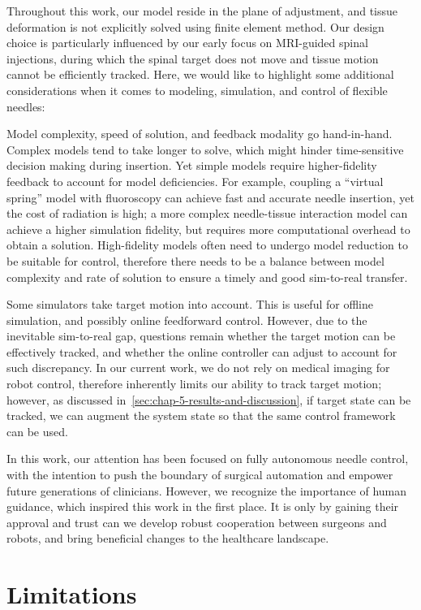 Throughout this work, our model reside in the plane of adjustment, and tissue deformation is not explicitly solved using finite element method. Our design choice is particularly influenced by our early focus on MRI-guided spinal injections, during which the spinal target does not move and tissue motion cannot be efficiently tracked. Here, we would like to highlight some additional considerations when it comes to modeling, simulation, and control of flexible needles:

Model complexity, speed of solution, and feedback modality go hand-in-hand. Complex models tend to take longer to solve, which might hinder time-sensitive decision making during insertion. Yet simple models require higher-fidelity feedback to account for model deficiencies. For example, coupling a ``virtual spring'' model with fluoroscopy can achieve fast and accurate needle insertion, yet the cost of radiation is high; a more complex needle-tissue interaction model can achieve a higher simulation fidelity, but requires more computational overhead to obtain a solution. High-fidelity models often need to undergo model reduction to be suitable for control, therefore there needs to be a balance between model complexity and rate of solution to ensure a timely and good sim-to-real transfer.

Some simulators take target motion into account. This is useful for offline simulation, and possibly online feedforward control. However, due to the inevitable sim-to-real gap, questions remain whether the target motion can be effectively tracked, and whether the online controller can adjust to account for such discrepancy. In our current work, we do not rely on medical imaging for robot control, therefore inherently limits our ability to track target motion; however, as discussed in~\cref{sec:chap-5-results-and-discussion}, if target state can be tracked, we can augment the system state so that the same control framework can be used.

In this work, our attention has been focused on fully autonomous needle control, with the intention to push the boundary of surgical automation and empower future generations of clinicians. However, we recognize the importance of human guidance, which inspired this work in the first place. It is only by gaining their approval and trust can we develop robust cooperation between surgeons and robots, and bring beneficial changes to the healthcare landscape.


\section{Limitations}
\label{sec:chap-6-limitations}

